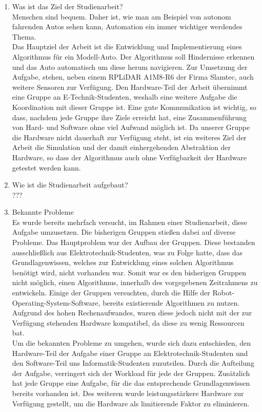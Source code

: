 \documentclass[12pt]{article}
\begin{document}
\begin{enumerate}
    \item Was ist das Ziel der Studienarbeit?\\
    Menschen sind bequem.
    Daher ist, wie man am Beispiel von autonom fahrenden Autos sehen kann, Automation ein immer wichtiger werdendes Thema.\\

    Das Hauptziel der Arbeit ist die Entwicklung und Implementierung eines Algorithmus für ein Modell-Auto. 
    Der Algorithmus soll Hindernisse erkennen und das Auto automatisch um diese herum navigieren.
    Zur Umsetzung der Aufgabe, stehen, neben einem RPLiDAR A1M8-R6 der Firma Slamtec, auch weitere Sensoren zur Verf{\"u}gung.
    Den Hardware-Teil der Arbeit übernimmt eine Gruppe an E-Technik-Studenten, weshalb eine weitere Aufgabe die Koordination mit dieser Gruppe ist.
    Eine gute Kommunikation ist wichtig, so dass, nachdem jede Gruppe ihre Ziele erreicht hat, eine Zusammenf{\"u}hrung von Hard- und Software ohne viel Aufwand m{\"o}glich ist.
    Da unserer Gruppe die Hardware nicht dauerhaft zur Verfügung steht, ist ein weiteres Ziel der Arbeit die Simulation und der damit einhergehenden Abstraktion der Hardware, so dass der Algorithmus auch ohne Verfügbarkeit der Hardware getestet werden kann.    

    \item Wie ist die Studienarbeit aufgebaut?\\
    ???

    \item Bekannte Probleme\\
    Es wurde bereits mehrfach versucht, im Rahmen einer Studienarbeit, diese Aufgabe umzusetzen.
    Die bisherigen Gruppen stießen dabei auf diverse Probleme.
    Das Hauptproblem war der Aufbau der Gruppen.
    Diese bestanden ausschließlich aus Elektrotechnik-Studenten, was zu Folge hatte, dass das Grundlagenwissen, welches zur Entwicklung eines solchen Algorithmus benötigt wird, nicht vorhanden war.
    Somit war es den bisherigen Gruppen nicht möglich, einen Algorithmus, innerhalb des vorgegebenen Zeitrahmens zu entwickeln.
    Einige der Gruppen versuchten, durch die Hilfe der Robot-Operating-System-Software, bereits existierende Algorithmen zu nutzen. 
    Aufgrund des hohen Rechenaufwandes, waren diese jedoch nicht mit der zur Verfügung stehenden Hardware kompatibel, da diese zu wenig Ressourcen bat.\\

    Um die bekannten Probleme zu umgehen, wurde sich dazu entschieden, den Hardware-Teil der Aufgabe einer Gruppe an Elektrotechnik-Studenten und den Software-Teil uns Informatik-Studenten zuzuteilen.
    Durch die Aufteilung der Aufgabe, verringert sich der Workload für jede der Gruppen. 
    Zusätzlich hat jede Gruppe eine Aufgabe, für die das entsprechende Grundlagenwissen bereits vorhanden ist.
    Des weiteren wurde leistungsstärkere Hardware zur Verfügung gestellt, um die Hardware als limitierende Faktor zu eliminieren.

\end{enumerate}
\end{document}
